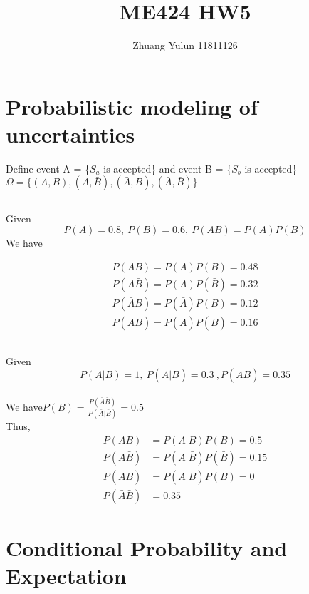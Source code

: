 \documentclass{article}
\title{ME424 HW5}
\author{Zhuang Yulun 11811126}
\begin{document}
\maketitle

\section{Probabilistic modeling of uncertainties}

Define event A = \{$S_a$ is accepted\} and event B = \{$S_b$ is accepted\}\\
$\Omega = \{(A,B),(A,\bar{B}),(\bar{A},B),(\bar{A},\bar{B})\}$\\
\subsection{}
Given 
$$
P(A) = 0.8,\ P(B) = 0.6,\ P(AB) = P(A)P(B)
$$
We have

\begin{align*}
    P(AB)=P(A)P(B)=0.48\\
    P(A\bar{B})=P(A)P(\bar{B})=0.32\\
    P(\bar{A}B)=P(\bar{A})P(B)=0.12\\
    P(\bar{A}\bar{B})=P(\bar{A})P(\bar{B})=0.16
\end{align*}

\subsection{}
Given
$$
P(A|B)=1,\ P(A|\bar{B})=0.3\ ,P(\bar{A}\bar{B})=0.35
$$
\\
We have$P(B)=\frac{P(\bar{A}\bar{B})}{P(\bar{A}|\bar{B})}=0.5$\\
Thus,
\begin{align*}
    P(AB)&=P(A|B)P(B)=0.5\\
    P(A\bar{B})&=P(A|\bar{B})P(\bar{B})=0.15\\
    P(\bar{A}B)&=P(\bar{A}|B)P(B)=0\\
    P(\bar{A}\bar{B})&=0.35
\end{align*}

\section{Conditional Probability and Expectation}
\end{document}
